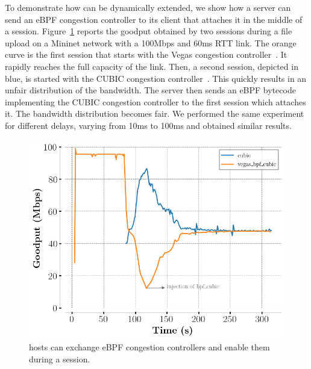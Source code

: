 To demonstrate how \tcpls can be dynamically extended, we show how a server can 
send an eBPF congestion controller to its client that attaches it in the middle 
of a \tcpls session. Figure~\ref{fig:vegasCubic} reports the goodput obtained 
by two \tcpls sessions during a file upload on a Mininet network with a 
100Mbps and 60ms RTT link.
The orange curve is the first \tcpls session that starts with the Vegas 
congestion controller~\cite{10.1145/190314.190317}. It rapidly reaches the 
full capacity of the link. Then, a second \tcpls session, depicted in blue, is 
started with the CUBIC congestion controller~\cite{rfc8312}. This quickly 
results in an unfair distribution of the bandwidth. The server then sends an 
eBPF bytecode implementing the CUBIC congestion controller to the first \tcpls 
session which attaches it. The bandwidth distribution becomes fair. We 
performed the same experiment for different delays, varying from 10ms to 100ms 
and obtained similar results.

\begin{figure}[!t]
  \begin{center}
    \includegraphics[width=.8\columnwidth]{pretty_plotify/plots/vegas_cubic.png}
  \end{center}
\vspace{-0.5cm}
  \caption{\tcpls hosts can exchange eBPF congestion controllers and enable 
  them during a \tcpls session.}
  \label{fig:vegasCubic}
\end{figure}
